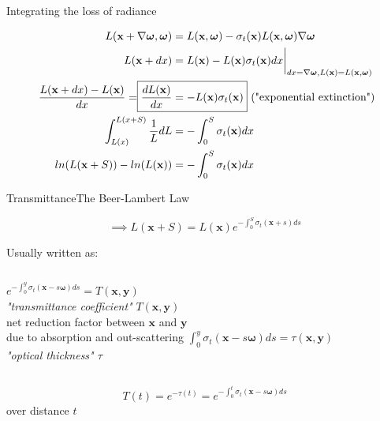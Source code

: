 \documentclass[
  english,            %
  aspectratio=169,    %
]{tumbeamer}
\newcommand\bx[0]{\textbf{x}}
\newcommand\by[0]{\textbf{y}}
\newcommand\bomega[0]{\boldsymbol{\omega}}
\begin{document}
\begin{frame}{Integrating the loss of radiance}
\begin{figure}[ht]
    \centering
    \scalebox{.6}{
        
    }
    \begin{align}
    \begin{aligned}
        L(\bx + \nabla\bomega,\bomega) &= 
            L(\bx,\bomega) - \sigma_t(\bx)L(\bx,\bomega)\nabla\bomega \\ 
        L(\bx + dx) &= 
            L(\bx) - L(\bx)\sigma_t(\bx)dx\bigg|_{dx=\nabla\bomega,
            L(\bx)=L(\bx, \bomega)} \\
        \frac{L(\bx + dx) - L(\bx)}{dx} = \Aboxed{\frac{dL(\bx)}{dx} &=
        -L(\bx)\sigma_t(\bx)} \text{ ("exponential extinction")}\\
        \int_{L(x)}^{L(x+S)} \frac{1}{L} dL &= -\int_0^S \sigma_t(\bx)dx\\
        ln(L(\bx+S)) - ln(L(\bx)) &= - \int_0^S \sigma_t(\bx) dx
    \end{aligned}
    \end{align}
\end{figure}
\end{frame}


\begin{frame}{Transmittance}{The Beer-Lambert Law}
\begin{figure}[ht]
$$ \implies L(\bx + S) = L(\bx)e^{-\int_0^S \sigma_t(\bx+s)ds} $$
\end{figure}

Usually written as:\\
\begin{columns}[t, onlytextwidth]
    $e^{-\int_0^y \sigma_t(\bx-s\bomega)ds} = T(\bx, \by)$
    \\
    \textit{"transmittance coefficient"} $T(\bx, \by)$\\
    net reduction factor between $\bx$ and $\by$ \\due to absorption and
    out-scattering
    $\int_0^y \sigma_t(\bx-s\bomega)ds = \tau(\bx,\by)$\\
    \textit{"optical thickness" $\tau$}
\end{columns}

\vfill
$$ T(t) = e^{-\tau(t)} = e^{-\int_0^t \sigma_t(\bx-s\bomega)ds} $$
    \centering over distance $t$

\end{frame}
\end{document}
